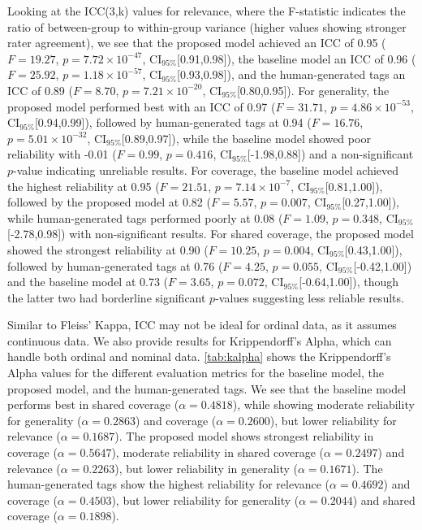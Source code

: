 Looking at the ICC(3,k) values for relevance, where the F-statistic indicates the ratio of between-group to within-group variance (higher values showing stronger rater agreement), we see that the proposed model achieved an ICC of 0.95 ($F=19.27$, $p=7.72\times10^{-47}$, CI$_{95\%}$[0.91,0.98]), the baseline model an ICC of 0.96 ($F=25.92$, $p=1.18\times10^{-57}$, CI$_{95\%}$[0.93,0.98]), and the human-generated tags an ICC of 0.89 ($F=8.70$, $p=7.21\times10^{-20}$, CI$_{95\%}$[0.80,0.95]). For generality, the proposed model performed best with an ICC of 0.97 ($F=31.71$, $p=4.86\times10^{-53}$, CI$_{95\%}$[0.94,0.99]), followed by human-generated tags at 0.94 ($F=16.76$, $p=5.01\times10^{-32}$, CI$_{95\%}$[0.89,0.97]), while the baseline model showed poor reliability with -0.01 ($F=0.99$, $p=0.416$, CI$_{95\%}$[-1.98,0.88]) and a non-significant $p$-value indicating unreliable results. For coverage, the baseline model achieved the highest reliability at 0.95 ($F=21.51$, $p=7.14\times10^{-7}$, CI$_{95\%}$[0.81,1.00]), followed by the proposed model at 0.82 ($F=5.57$, $p=0.007$, CI$_{95\%}$[0.27,1.00]), while human-generated tags performed poorly at 0.08 ($F=1.09$, $p=0.348$, CI$_{95\%}$[-2.78,0.98]) with non-significant results. For shared coverage, the proposed model showed the strongest reliability at 0.90 ($F=10.25$, $p=0.004$, CI$_{95\%}$[0.43,1.00]), followed by human-generated tags at 0.76 ($F=4.25$, $p=0.055$, CI$_{95\%}$[-0.42,1.00]) and the baseline model at 0.73 ($F=3.65$, $p=0.072$, CI$_{95\%}$[-0.64,1.00]), though the latter two had borderline significant $p$-values suggesting less reliable results.

Similar to Fleiss' Kappa, ICC may not be ideal for ordinal data, as it assumes continuous data. We also provide results for Krippendorff's Alpha, which can handle both ordinal and nominal data. \cref{tab:kalpha} shows the Krippendorff's Alpha values for the different evaluation metrics for the baseline model, the proposed model, and the human-generated tags. We see that the baseline model performs best in shared coverage ($\alpha=0.4818$), while showing moderate reliability for generality ($\alpha=0.2863$) and coverage ($\alpha=0.2600$), but lower reliability for relevance ($\alpha=0.1687$). The proposed model shows strongest reliability in coverage ($\alpha=0.5647$), moderate reliability in shared coverage ($\alpha=0.2497$) and relevance ($\alpha=0.2263$), but lower reliability in generality ($\alpha=0.1671$). The human-generated tags show the highest reliability for relevance ($\alpha=0.4692$) and coverage ($\alpha=0.4503$), but lower reliability for generality ($\alpha=0.2044$) and shared coverage ($\alpha=0.1898$). 

